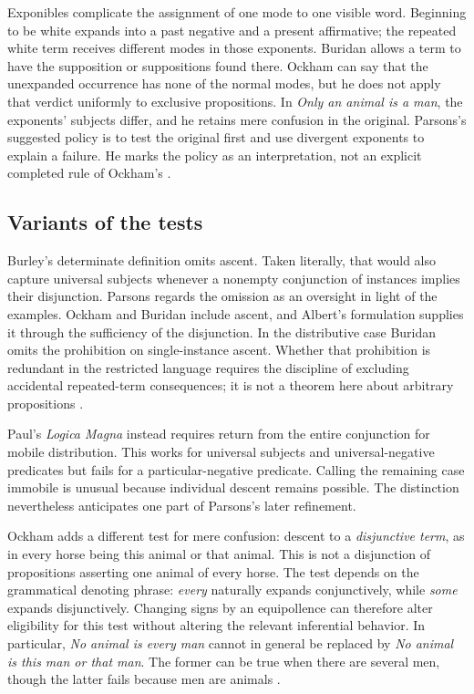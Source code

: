 Exponibles complicate the assignment of one mode to one visible word.
Beginning to be white expands into a past negative and a present
affirmative; the repeated white term receives different modes in those
exponents. Buridan allows a term to have the supposition or suppositions
found there. Ockham can say that the unexpanded occurrence has none of
the normal modes, but he does not apply that verdict uniformly to
exclusive propositions. In \emph{Only an animal is a man}, the
exponents' subjects differ, and he retains mere confusion in the
original. Parsons's suggested policy is to test the original first and
use divergent exponents to explain a failure. He marks the policy as an
interpretation, not an explicit completed rule of Ockham's
\cite[pp.~259--260]{Parsons2007FordhamSupposition}.

\subsection{Variants of the tests}
\label{sec:p13-supposition-variants}

Burley's determinate definition omits ascent. Taken literally, that
would also capture universal subjects whenever a nonempty conjunction
of instances implies their disjunction. Parsons regards the omission
as an oversight in light of the examples. Ockham and Buridan include
ascent, and Albert's formulation supplies it through the sufficiency
of the disjunction. In the distributive case Buridan omits the
prohibition on single-instance ascent. Whether that prohibition is
redundant in the restricted language requires the discipline of excluding
accidental repeated-term consequences; it is not a theorem here about
arbitrary propositions
\cite[pp.~260--262]{Parsons2007FordhamSupposition}.

Paul's \emph{Logica Magna} instead requires return from the entire
conjunction for mobile distribution. This works for universal subjects
and universal-negative predicates but fails for a particular-negative
predicate. Calling the remaining case immobile is unusual because
individual descent remains possible. The distinction nevertheless
anticipates one part of Parsons's later refinement.

Ockham adds a different test for mere confusion: descent to a
\emph{disjunctive term}, as in every horse being this animal or that
animal. This is not a disjunction of propositions asserting one animal
of every horse. The test depends on the grammatical denoting phrase:
\emph{every} naturally expands conjunctively, while \emph{some}
expands disjunctively. Changing signs by an equipollence can therefore
alter eligibility for this test without altering the relevant
inferential behavior. In particular, \emph{No animal is every man}
cannot in general be replaced by \emph{No animal is this man or that
man}. The former can be true when there are several men, though the
latter fails because men are animals
\cite[pp.~262--265]{Parsons2007FordhamSupposition}.

